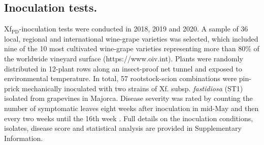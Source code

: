     \subsection{Inoculation tests.} Xf$_{\textrm{PD}}$-inoculation tests
    were
    conducted in 2018, 2019 and 2020. A sample of 36 local, regional and
    international wine-grape varieties was selected, which included nine of the
    10
    most cultivated wine-grape varieties representing more than 80\% of the
    worldwide vineyard surface (https://www.oiv.int). Plants were randomly
    distributed in 12-plant rows along an insect-proof net tunnel and exposed
    to
    environmental temperature. In total, 57 rootstock-scion combinations were
    pin-prick mechanically inoculated \cite{Almeida2003} with two strains of
    Xf.
    subsp. \textit{fastidiosa} (ST1) isolated from grapevines in Majorca.
    Disease
    severity was rated by counting the number of symptomatic leaves eight weeks
    after inoculation in mid-May and then every two weeks until the 16th week
    \cite{Moralejo2019}. Full details on the inoculation conditions, isolates,
    disease score and statistical analysis are provided in Supplementary
    Information.

